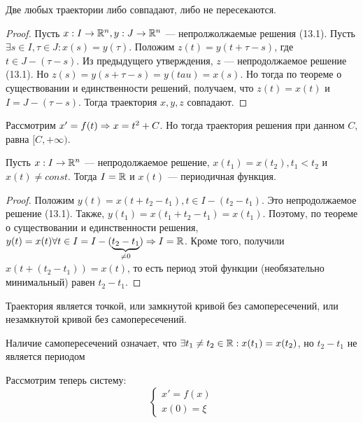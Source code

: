 \begin{proposition}
    Две любых траектории либо совпадают, либо не пересекаются.
\end{proposition}
\begin{proof}
    Пусть \(x: I \rightarrow \mathbb{R}^n, y: J \rightarrow \mathbb{R}^n\) --- непролжолжаемые решения (13.1). Пусть \(\exists s \in I, \tau \in J: x(s) = y(\tau)\). Положим \(z(t) = y(t + \tau - s)\), где \(t \in J - (\tau - s)\). Из предыдущего утверждения, \(z\) --- непродолжаемое решение (13.1). Но \(z(s) = y(s + \tau - s) = y(tau) = x(s)\). Но тогда по теореме о существовании и единственности решений, получаем, что \(z(t) = x(t)\) и \(I = J - (\tau - s)\). Тогда траектория \(x, y, z\) совпадают.
\end{proof}

\begin{example}
    Рассмотрим \(x' = f(t) \Rightarrow x = t^2 + C\). Но тогда траектория решения при данном \(C\), равна \([C, +\infty)\).
\end{example}

\begin{proposition}
    Пусть \(x: I \rightarrow \mathbb{R}^n\) --- непродолжаемое решение, \(x(t_1) = x(t_2), t_1 < t_2\) и \(x(t) \ne const\). Тогда \(I = \mathbb{R}\) и \(x(t)\) --- периодичная функция.
\end{proposition}
\begin{proof}
    Положим \(y(t) = x(t + t_2 - t_1), t \in I - (t_2 - t_1)\). Это непродолжаемое решение (13.1). Также, \(y(t_1) = x(t_1 + t_2 - t_1) = x(t_1)\). Поэтому, по теореме о существовании и единственности решения, \(y(t) = x(t) \forall t \in I = I - (\underbrace{t_2 - t_1}_{\ne 0}) \Rightarrow I = \mathbb{R}\). Кроме того, получили \(x(t + (t_2 - t_1)) = x(t)\), то есть период этой функции (необязательно минимальный) равен \(t_2 - t_1\).
\end{proof}

\begin{corollary}
    Траектория является точкой, или замкнутой кривой без самопересечений, или незамкнутой кривой без самопересечений.
\end{corollary}
\begin{note}
    Наличие самопересечений означает, что \(\exists t_1 \ne t_2 \in \mathbb{R}: x(t_1) = x(t_2)\), но \(t_2 - t_1\) не является периодом
\end{note}

Рассмотрим теперь систему:
\begin{equation}
    \begin{cases}
        x' = f(x) \\
        x(0) = \xi
    \end{cases}
\end{equation}

